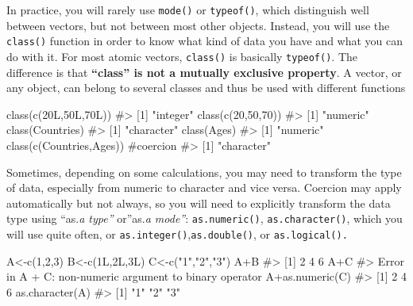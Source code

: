 \documentclass[
  letterpaper,
  DIV=11,
  numbers=noendperiod]{scrreprt}
\newenvironment{Shaded}{\begin{snugshade}}{\end{snugshade}}
\newcommand{\CommentTok}[1]{\textcolor[rgb]{0.37,0.37,0.37}{#1}}
\newcommand{\DecValTok}[1]{\textcolor[rgb]{0.68,0.00,0.00}{#1}}
\newcommand{\FunctionTok}[1]{\textcolor[rgb]{0.28,0.35,0.67}{#1}}
\newcommand{\NormalTok}[1]{\textcolor[rgb]{0.00,0.23,0.31}{#1}}
\newcommand{\OtherTok}[1]{\textcolor[rgb]{0.00,0.23,0.31}{#1}}
\newcommand{\SpecialCharTok}[1]{\textcolor[rgb]{0.37,0.37,0.37}{#1}}
\newcommand{\StringTok}[1]{\textcolor[rgb]{0.13,0.47,0.30}{#1}}
\begin{document}
In practice, you will rarely use \texttt{mode()} or \texttt{typeof()},
which distinguish well between vectors, but not between most other
objects. Instead, you will use the \texttt{class()} function in order to
know what kind of data you have and what you can do with it. For most
atomic vectors, \texttt{class()} is basically \texttt{typeof()}. The
difference is that \textbf{``class'' is not a mutually exclusive
property}. A vector, or any object, can belong to several classes and
thus be used with different functions

\begin{Shaded}
\begin{Highlighting}[]
\FunctionTok{class}\NormalTok{(}\FunctionTok{c}\NormalTok{(}\DecValTok{20}\NormalTok{L,}\DecValTok{50}\NormalTok{L,}\DecValTok{70}\NormalTok{L))}
\CommentTok{\#\textgreater{} [1] "integer"}
\FunctionTok{class}\NormalTok{(}\FunctionTok{c}\NormalTok{(}\DecValTok{20}\NormalTok{,}\DecValTok{50}\NormalTok{,}\DecValTok{70}\NormalTok{))}
\CommentTok{\#\textgreater{} [1] "numeric"}
\FunctionTok{class}\NormalTok{(Countries)}
\CommentTok{\#\textgreater{} [1] "character"}
\FunctionTok{class}\NormalTok{(Ages)}
\CommentTok{\#\textgreater{} [1] "numeric"}
\FunctionTok{class}\NormalTok{(}\FunctionTok{c}\NormalTok{(Countries,Ages)) }\CommentTok{\#coercion}
\CommentTok{\#\textgreater{} [1] "character"}
\end{Highlighting}
\end{Shaded}

Sometimes, depending on some calculations, you may need to transform the
type of data, especially from numeric to character and vice versa.
Coercion may apply automatically but not always, so you will need to
explicitly transform the data type using ``as.\emph{a type''}
or''as.\emph{a mode''}: \texttt{as.numeric()}, \texttt{as.character()},
which you will use quite often, or
\texttt{as.integer()},\texttt{as.double()}, or \texttt{as.logical().}

\begin{Shaded}
\begin{Highlighting}[]
\NormalTok{A}\OtherTok{\textless{}{-}}\FunctionTok{c}\NormalTok{(}\DecValTok{1}\NormalTok{,}\DecValTok{2}\NormalTok{,}\DecValTok{3}\NormalTok{)}
\NormalTok{B}\OtherTok{\textless{}{-}}\FunctionTok{c}\NormalTok{(}\DecValTok{1}\NormalTok{L,}\DecValTok{2}\NormalTok{L,}\DecValTok{3}\NormalTok{L)}
\NormalTok{C}\OtherTok{\textless{}{-}}\FunctionTok{c}\NormalTok{(}\StringTok{"1"}\NormalTok{,}\StringTok{"2"}\NormalTok{,}\StringTok{"3"}\NormalTok{)}
\NormalTok{A}\SpecialCharTok{+}\NormalTok{B}
\CommentTok{\#\textgreater{} [1] 2 4 6}
\NormalTok{A}\SpecialCharTok{+}\NormalTok{C}
\CommentTok{\#\textgreater{} Error in A + C: non{-}numeric argument to binary operator}
\NormalTok{A}\SpecialCharTok{+}\FunctionTok{as.numeric}\NormalTok{(C)}
\CommentTok{\#\textgreater{} [1] 2 4 6}
\FunctionTok{as.character}\NormalTok{(A)}
\CommentTok{\#\textgreater{} [1] "1" "2" "3"}
\end{Highlighting}
\end{Shaded}
\end{document}
